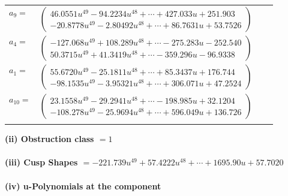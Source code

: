 \documentclass[1p]{elsarticle_modified}
\theoremstyle{definition}
\begin{document}
\begin{tabular}{m{7pt} m{180pt} m{7pt} m{180pt} }
\flushright $a_{9}=$&$\begin{pmatrix}46.0551 u^{49}-94.2234 u^{48}+\cdots+427.033 u+251.903\\-20.8778 u^{49}-2.80492 u^{48}+\cdots+86.7631 u+53.7526\end{pmatrix}$ \\
\flushright $a_{4}=$&$\begin{pmatrix}-127.068 u^{49}+108.289 u^{48}+\cdots-275.283 u-252.540\\50.3715 u^{49}+41.3419 u^{48}+\cdots-359.296 u-96.9338\end{pmatrix}$ \\
\flushright $a_{1}=$&$\begin{pmatrix}55.6720 u^{49}-25.1811 u^{48}+\cdots+85.3437 u+176.744\\-98.1535 u^{49}-3.95321 u^{48}+\cdots+306.071 u+47.2524\end{pmatrix}$ \\
\flushright $a_{10}=$&$\begin{pmatrix}23.1558 u^{49}-29.2941 u^{48}+\cdots-198.985 u+32.1204\\-108.278 u^{49}-25.9694 u^{48}+\cdots+596.049 u+136.726\end{pmatrix}$\\&\end{tabular}
\flushleft \textbf{(ii) Obstruction class $= 1$}\\~\\
\flushleft \textbf{(iii) Cusp Shapes $= -221.739 u^{49}+57.4222 u^{48}+\cdots+1695.90 u+57.7020$}\\~\\
\newpage\renewcommand{\arraystretch}{1}
\flushleft \textbf{(iv) u-Polynomials at the component}\newline \\
\end{document}
